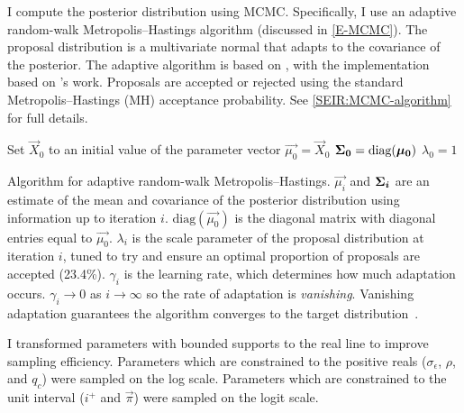 \documentclass[thesis.tex]{subfiles}
\begin{document}
I compute the posterior distribution using MCMC.
Specifically, I use an adaptive random-walk Metropolis--Hastings algorithm (discussed in \cref{E-MCMC}).
The proposal distribution is a multivariate normal that adapts to the covariance of the posterior.
The adaptive algorithm is based on \textcite[algorithm 4]{andrieuTutorial}, with the implementation based on \textcite{ghoshApproximate}'s work.
Proposals are accepted or rejected using the standard Metropolis--Hastings (MH) acceptance probability.
See \cref{SEIR:MCMC-algorithm} for full details.

\begin{algorithm}
 Set $\vec{X}_0$ to an initial value of the parameter vector \;
 $\vec{\mu_0} = \vec{X}_0$ \;
 $\bm{\Sigma_0} = \text{diag}(\bm{\mu_0})$ \;
 $\lambda_0 = 1$ \;
 \caption{Algorithm for adaptive random-walk Metropolis--Hastings. $\vec{\mu_i}$ and $\bm{\Sigma_i}$ are an estimate of the mean and covariance of the posterior distribution using information up to iteration $i$. $\text{diag}(\vec{\mu_0})$ is the diagonal matrix with diagonal entries equal to $\vec{\mu_0}$. $\lambda_i$ is the scale parameter of the proposal distribution at iteration $i$, tuned to try and ensure an optimal proportion of proposals are accepted (23.4\%). $\gamma_i$ is the learning rate, which determines how much adaptation occurs. $\gamma_i \to 0$ as $i \to \infty$ so the rate of adaptation is \emph{vanishing}. Vanishing adaptation guarantees the algorithm converges to the target distribution~\autocite[section 3]{andrieuTutorial}.}
 \label{SEIR:MCMC-algorithm}
\end{algorithm}

I transformed parameters with bounded supports to the real line to improve sampling efficiency.
Parameters which are constrained to the positive reals ($\sigma_\epsilon$, $\rho$, and $q_c$) were sampled on the log scale.
Parameters which are constrained to the unit interval ($i^+$ and $\vec{\pi}$) were sampled on the logit scale.
\end{document}
